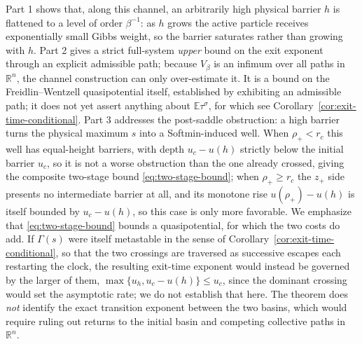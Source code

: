 \documentclass{opt2026} %
\newcommand{\R}{\mathbb{R}}
\newcommand{\E}{\mathbb{E}}
\begin{document}
\begin{remark}
\label{rem:scope}
Part 1 shows that, along this channel, an arbitrarily high physical barrier $h$ is flattened to a level of order $\beta^{-1}$: as $h$ grows the active particle receives exponentially small Gibbs weight, so the barrier saturates rather than growing with $h$. Part 2 gives a strict full-system \emph{upper} bound on the exit exponent through an explicit admissible path; because $V_\beta$ is an infimum over all paths in $\R^n$, the channel construction can only over-estimate it. It is a bound on the Freidlin--Wentzell quasipotential itself, established by exhibiting an admissible path; it does not yet assert anything about $\E\tau^\sigma$, for which see Corollary~\ref{cor:exit-time-conditional}. Part 3 addresses the post-saddle obstruction: a high barrier turns the physical maximum $s$ into a Softmin-induced well. When $\rho_+<r_c$ this well has equal-height barriers, with depth $u_c-u(h)$ strictly below the initial barrier $u_c$, so it is not a worse obstruction than the one already crossed, giving the composite two-stage bound \eqref{eq:two-stage-bound}; when $\rho_+\ge r_c$ the $z_+$ side presents no intermediate barrier at all, and its monotone rise $u(\rho_+)-u(h)$ is itself bounded by $u_c-u(h)$, so this case is only more favorable. We emphasize that \eqref{eq:two-stage-bound} bounds a quasipotential, for which the two costs do add. If $\Gamma(s)$ were itself metastable in the sense of Corollary~\ref{cor:exit-time-conditional}, so that the two crossings are traversed as successive escapes each restarting the clock, the resulting exit-time exponent would instead be governed by the larger of them, $\max\{u_h,u_c-u(h)\}\le u_c$, since the dominant crossing would set the asymptotic rate; we do not establish that here. The theorem does \emph{not} identify the exact transition exponent between the two basins, which would require ruling out returns to the initial basin and competing collective paths in $\R^n$.
\end{remark}
\end{document}
